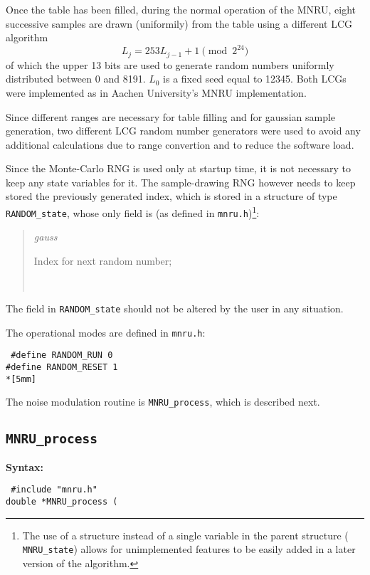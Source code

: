 Once the table has been filled, during the normal operation of the
MNRU, eight successive samples are drawn (uniformily) from the table
using a different LCG algorithm
\[
            L_{j} = 253 L_{j-1} + 1 \pmod{2^{24}}
\]
of which the upper 13 bits are used to generate random numbers
uniformly distributed between 0 and 8191. $L_0$ is a fixed seed equal
to 12345. Both LCGs were implemented as in Aachen University's MNRU
implementation.

Since different ranges are necessary for table filling and for
gaussian sample generation, two different LCG random number generators
were used to avoid any additional calculations due to range convertion
and to reduce the software load.

Since the Monte-Carlo RNG is used only at startup time, it is not
necessary to keep any state variables for it. The sample-drawing RNG
however needs to keep stored the previously generated index, which is
stored in a structure of type {\tt RANDOM\_state}, whose only field
is (as defined in {\tt mnru.h})\footnote{\SF The use of a structure
instead of a single variable in the parent structure ({\tt
MNRU\_state}) allows for unimplemented features to be easily added in
a later version of the algorithm.}:
\begin{quote} \normalsize
 {\em gauss}    \hfill \parbox{100mm}{\SF Index for next random number;}\\
\end{quote}

The field in {\tt RANDOM\_state} should not be altered by the user in
any situation.

The operational modes are defined in {\tt mnru.h}:

 \parbox[t]{120mm}{\tt
\#define RANDOM\_RUN 0\\
\#define RANDOM\_RESET 1\\*[5mm]
}

The noise modulation routine is {\tt MNRU\_process}, which is described
next.

\subsection{{\tt MNRU\_process}}

{\bf Syntax: }

{\tt
\#include "mnru.h"\\
double *MNRU\_process (
}

